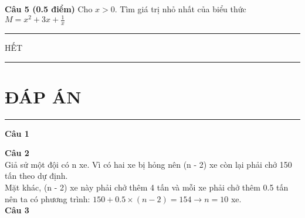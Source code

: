 \textbf{Câu 5 (0.5 điểm)} Cho $ x > 0$. Tìm giá trị nhỏ nhất của biểu thức $ M = x^{2} + 3x + \displaystyle\frac{1}{x} $

\begin{center}
\rule[0,05cm]{5cm}{0,05cm}
HẾT
\rule[0,05cm]{5cm}{0,05cm}

\end{center}
\newpage
\section*{\centering ĐÁP ÁN} 
\rule[0,05cm]{16cm}{0,05cm}
\textbf{Câu 1}

\textbf{Câu 2}\\
Giả sử một đội có n xe. Vì có hai xe bị hỏng nên (n - 2) xe còn lại phải chở 150 tấn theo dự định. \\
Mặt khác, (n - 2) xe này phải chở thêm 4 tấn và mỗi xe phải chở thêm 0.5 tấn nên ta có phương trình: $150 + 0.5 \times (n - 2) =154 \rightarrow n = 10$ xe.\\
\textbf{Câu 3}
